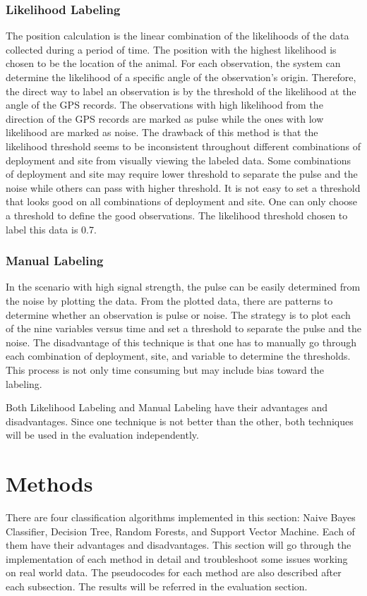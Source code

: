 \documentclass[twoside]{article}
\begin{document}
\subsubsection{Likelihood Labeling}
The position calculation is the linear combination of the likelihoods of the data collected during a period of time. The position with the highest likelihood is chosen to be the location of the animal. For each observation, the system can determine the likelihood of a specific angle of the observation's origin. Therefore, the direct way to label an observation is by the threshold of the likelihood at the angle of the GPS records. The observations with high likelihood from the direction of the GPS records are marked as pulse while the ones with low likelihood are marked as noise. The drawback of this method is that the likelihood threshold seems to be inconsistent throughout different combinations of deployment and site from visually viewing the labeled data. Some combinations of deployment and site may require lower threshold to separate the pulse and the noise while others can pass with higher threshold. It is not easy to set a threshold that looks good on all combinations of deployment and site. One can only choose a threshold to define the good observations. The likelihood threshold chosen to label this data is 0.7.

\subsubsection{Manual Labeling}
In the scenario with high signal strength, the pulse can be easily determined from the noise by plotting the data. From the plotted data, there are patterns to determine whether an observation is pulse or noise. The strategy is to plot each of the nine variables versus time and set a threshold to separate the pulse and the noise. The disadvantage of this technique is that one has to manually go through each combination of deployment, site, and variable to determine the thresholds. This process is not only time consuming but may include bias toward the labeling. 

\hfill \break
\noindent
Both Likelihood Labeling and Manual Labeling have their advantages and disadvantages. Since one technique is not better than the other, both techniques will be used in the evaluation independently.



\section{Methods}
There are four classification algorithms implemented in this section: Naive Bayes Classifier, Decision Tree, Random Forests, and Support Vector Machine. Each of them have their advantages and disadvantages. This section will go through the implementation of each method in detail and troubleshoot some issues working on real world data. The pseudocodes for each method are also described after each subsection. The results will be referred in the evaluation section.
\end{document}

